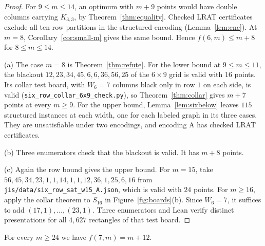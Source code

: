 \begin{proof}
For $9\le m\le14$, an optimum with $m+9$ points would have double
columns carrying $K_{3,3}$, by Theorem~\ref{thm:equality}.
Checked LRAT certificates exclude all ten row partitions in the
structured encoding (Lemma~\ref{lem:enc}).
At $m=8$, Corollary~\ref{cor:small-m} gives the same bound.
Hence $f(6,m)\le m+8$ for $8\le m\le14$.

(a) The case $m=8$ is Theorem~\ref{thm:refute}. For the lower bound at $9\le m\le11$, the
blackout $12,\allowbreak 23,\allowbreak 34,\allowbreak 45,\allowbreak 6,\allowbreak 6,\allowbreak 36,\allowbreak 56,\allowbreak 25$ of the $6\times9$ grid is valid with $16$ points. Its
collar test board, with $W_6=7$ columns black only in row $1$ on each side, is valid
(\nolinkurl{six_row_collar_6x9_check.py}), so Theorem~\ref{thm:collar} gives $m+7$ points at every
$m\ge9$. For the upper bound, Lemma~\ref{lem:sixbelow} leaves $115$ structured instances at each
width, one for each labeled graph in its three cases. They are unsatisfiable under two
encodings, and encoding A has checked LRAT certificates.

(b) Three enumerators check that the blackout is valid. It has $m+8$ points.

(c) Again the row bound gives the upper bound. For $m=15$, take
$56,\allowbreak 45,\allowbreak 34,\allowbreak 23,\allowbreak 1,\allowbreak 1,\allowbreak 14,\allowbreak 1,\allowbreak 1,\allowbreak 12,\allowbreak 36,\allowbreak 1,\allowbreak 25,\allowbreak 6,\allowbreak 16$
from \nolinkurl{jis/data/six_row_sat_w15_A.json}, which is valid with
$24$ points. For $m\ge16$, apply the collar theorem to $S_{16}$ in
Figure~\ref{fig:boards}(b). Since $W_6=7$, it suffices to add
$(17,1),\dots,(23,1)$. Three enumerators and Lean verify distinct
presentations for all $4{,}627$ rectangles of that test board.
\end{proof}

\begin{theorem}\label{thm:sevenrow}
For every $m\ge24$ we have $f(7,m)=m+12$.
\end{theorem}

